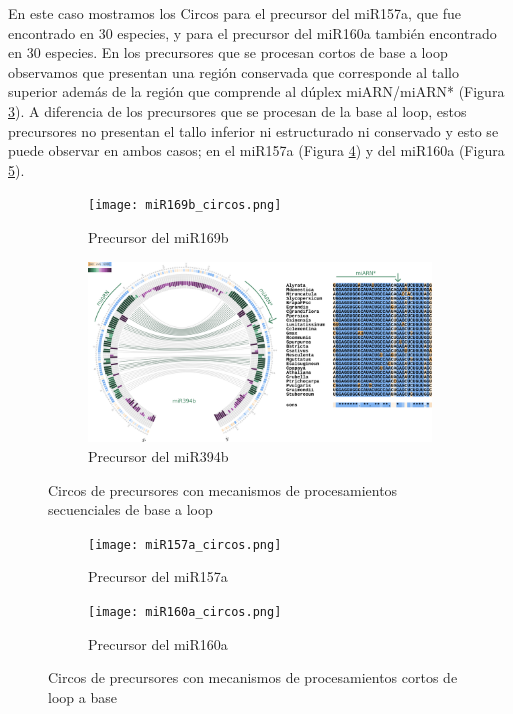 En este caso mostramos los Circos para el precursor del miR157a, que fue encontrado en 30 especies, y para el precursor del miR160a también encontrado en 30 especies. 
En los precursores que se procesan cortos de base a loop observamos que presentan una región conservada que corresponde al tallo superior además de la región que comprende al dúplex miARN/miARN* (Figura \ref{fig:seqBTL_circos}).
A diferencia de los precursores que se procesan de la base al loop, estos precursores no presentan el tallo inferior ni estructurado ni conservado y esto se puede observar en ambos casos; en el miR157a (Figura \ref{subfig:miR157a_circos}) y del miR160a (Figura \ref{subfig:miR160a_circos}).


\begin{landscape}
	\begin{figure}
	\centering
	\begin{subfigure}{.75\textwidth}
 \centering
 \texttt{[image: miR169b\_circos.png]}
 \caption{Precursor del miR169b}
 \label{subfig:miR169b_circos}
	\end{subfigure}%
	\begin{subfigure}{.75\textwidth}
 \centering
 \includegraphics[width=.9\linewidth]{miR394b_circos.png}
 \caption{Precursor del miR394b}
 \label{subfig:miR394b_circos}
	\end{subfigure}
	\caption{Circos de precursores con mecanismos de procesamientos secuenciales de base a loop}
	\label{fig:seqBTL_circos}
	\end{figure}
\end{landscape}


\begin{landscape}
	\begin{figure}
	\centering
	\begin{subfigure}{.75\textwidth}
 \centering
 \texttt{[image: miR157a\_circos.png]}
 \caption{Precursor del miR157a}
 \label{subfig:miR157a_circos}
	\end{subfigure}%
	\begin{subfigure}{.75\textwidth}
 \centering
 \texttt{[image: miR160a\_circos.png]}
 \caption{Precursor del miR160a}
 \label{subfig:miR160a_circos}
	\end{subfigure}
	\caption{Circos de precursores con mecanismos de procesamientos cortos de loop a base}
	\label{fig:srLTB_circos}
	\end{figure}
\end{landscape}

